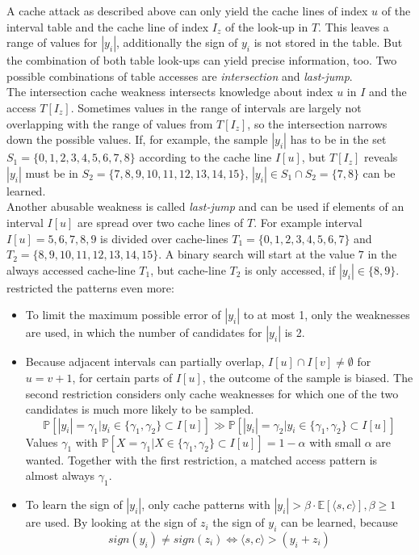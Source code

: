A cache attack as described above can only yield the cache lines of index $u$ of the interval table and the cache line of index $I_z$ of the look-up in $T$. This leaves a range of values for $|y_i|$, additionally the sign of $y_i$ is not stored in the table. But the combination of both table look-ups can yield precise information, too.
Two possible combinations of table accesses are \textit{intersection} and \textit{last-jump}. \\
The intersection cache weakness intersects knowledge about index $u$ in $I$ and the access $T[I_z]$. Sometimes values in the range of intervals are largely not overlapping with the range of values from $T[I_z]$, so the intersection narrows down the possible values. If, for example, the sample $|y_i|$ has to be in the set $S_1 = \{0,1,2,3,4,5,6,7,8\}$ according to the cache line $I[u]$, but $T[I_z]$ reveals $|y_i|$ must be in $S_2 = \{7,8,9,10,11,12,13,14,15\}$, $|y_i| \in S_1 \cap S_2 = \{7,8\}$ can be learned.\\
Another abusable weakness is called \textit{last-jump} and can be used if elements of an interval $I[u]$ are spread over two cache lines of $T$. For example interval $I[u] = {5,6,7,8,9}$ is divided over cache-lines $T_1 = \{0,1,2,3,4,5,6,7\}$ and $T_2 = \{8,9,10,11,12,13,14,15\}$. A binary search will start at the value $7$ in the always accessed cache-line $T_1$, but cache-line $T_2$ is only accessed, if $|y_i| \in \{8,9\}$.\\
\cite{cryptoeprint:2016:300} restricted the patterns even more: 
\begin{itemize}
	\item To limit the maximum possible error of $|y_i|$ to at most 1, only the weaknesses are used, in which the number of candidates for $|y_i|$ is 2.
	\item Because adjacent intervals can partially overlap, $I[u] \cap I[v] \neq \emptyset$ for $u = v+1$, for certain parts of $I[u]$, the outcome of the sample is biased.
	The second restriction considers only cache weaknesses for which one of the two candidates is much more likely to be sampled.
	\begin{equation*}
		\mathbb{P}[|y_i| = \gamma_1 | y_i \in \{\gamma_1,\gamma_2\}\subset I[u]] \gg \mathbb{P}[|y_i| = \gamma_2 | y_i \in \{\gamma_1,\gamma_2\}\subset I[u]]	
	\end{equation*}
	Values $\gamma_1$ with $\mathbb{P}[X=\gamma_1 | X \in \{\gamma_1, \gamma_2\}\subset I[u]] = 1-\alpha$ with small $\alpha$ are wanted.
	Together with the first restriction, a matched access pattern is almost always $\gamma_1$.
	\item To learn the sign of $|y_i|$, only cache patterns with $|y_i| > \beta \cdot \mathbb{E}[\langle s,c \rangle ], \beta \ge 1$ are used. By looking at the sign of $z_i$ the sign of $y_i$ can be learned, because 
	\begin{equation*}
	sign(y_i) \neq sign(z_i) \iff \langle s,c \rangle > (y_i+z_i)	
	\end{equation*}
\end{itemize}
